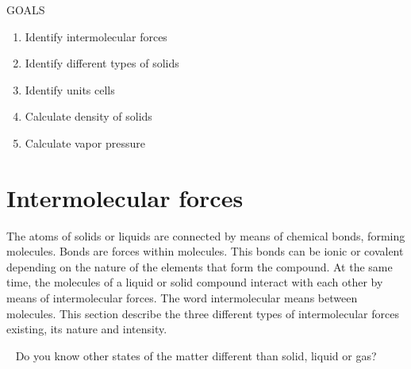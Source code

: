 \documentclass[main.tex]{subfiles}
\begin{document}
\begin{marginfigure}%
\begin{mytcbox}{GOALS}
\begin{enumerate}[label=\protect\circled{\color{white}\arabic*}]
\item Identify intermolecular forces
\item Identify different types of solids
\item Identify units cells
\item Calculate density of solids
\item Calculate vapor pressure
\end{enumerate}
\end{mytcbox}
\end{marginfigure}%




\section{Intermolecular forces}
The atoms of solids or liquids are connected by means of chemical bonds, forming molecules. Bonds are forces within molecules. This bonds can be ionic or covalent depending on the nature of the elements that form the compound. At the same time, the molecules of a liquid or solid compound interact with each other by means of intermolecular forces. The word intermolecular means between molecules. This section describe the three different types of intermolecular forces existing, its nature and intensity.
\begin{marginfigure}[-2cm]
\begin{tcolorbox}[enhanced,colback=red!5!white,colframe=black!50!red,boxrule=1pt,
  arc=0pt,outer arc=0pt,drop heavy lifted shadow]
\faGears\ 
 Do you know other states of the matter different than solid, liquid or gas?  \end{tcolorbox}
 \end{marginfigure}
\end{document}
